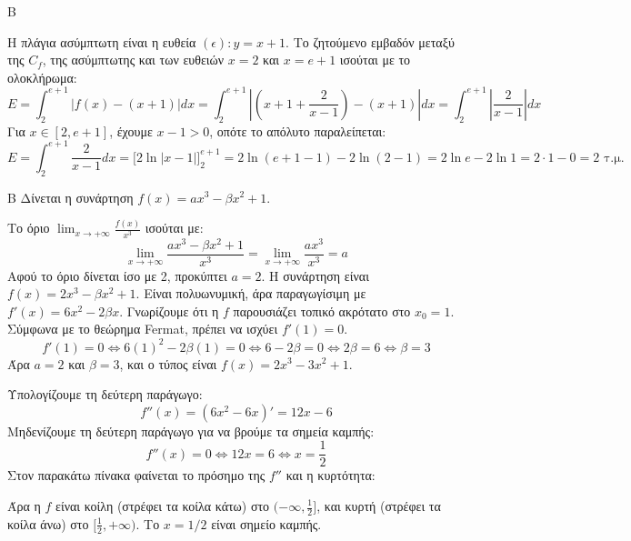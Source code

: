 \begin{thema}{Β}
\begin{erwthma}
\item Η πλάγια ασύμπτωτη είναι η ευθεία $(\epsilon): y = x+1$.
Το ζητούμενο εμβαδόν μεταξύ της $C_f$, της ασύμπτωτης και των ευθειών $x=2$ και $x=e+1$ ισούται με το ολοκλήρωμα:
\[ E = \int_2^{e+1} |f(x) - (x+1)| dx = \int_2^{e+1} \left| \left( x+1+\frac{2}{x-1} \right) - (x+1) \right| dx = \int_2^{e+1} \left| \frac{2}{x-1} \right| dx \]
Για $x \in [2, e+1]$, έχουμε $x-1 > 0$, οπότε το απόλυτο παραλείπεται:
\[ E = \int_2^{e+1} \frac{2}{x-1} dx = \Big[ 2\ln|x-1| \Big]_2^{e+1} = 2\ln(e+1-1) - 2\ln(2-1) = 2\ln e - 2\ln 1 = 2 \cdot 1 - 0 = 2 \text{ τ.μ.} \]
\end{erwthma}
\end{thema}

\begin{thema}{Β}
Δίνεται η συνάρτηση $f(x) = a x^3 - \beta x^2 + 1$.
\begin{erwthma}
\item Το όριο $\lim_{x\to+\infty} \frac{f(x)}{x^3}$ ισούται με:
\[ \lim_{x\to+\infty} \frac{a x^3 - \beta x^2 + 1}{x^3} = \lim_{x\to+\infty} \frac{a x^3}{x^3} = a \]
Αφού το όριο δίνεται ίσο με 2, προκύπτει $a=2$.
Η συνάρτηση είναι $f(x) = 2x^3 - \beta x^2 + 1$. Είναι πολυωνυμική, άρα παραγωγίσιμη με $f'(x) = 6x^2 - 2\beta x$.
Γνωρίζουμε ότι η $f$ παρουσιάζει τοπικό ακρότατο στο $x_0 = 1$. Σύμφωνα με το θεώρημα Fermat, πρέπει να ισχύει $f'(1) = 0$.
\[ f'(1) = 0 \Leftrightarrow 6(1)^2 - 2\beta(1) = 0 \Leftrightarrow 6 - 2\beta = 0 \Leftrightarrow 2\beta = 6 \Leftrightarrow \beta = 3 \]
Άρα $a=2$ και $\beta=3$, και ο τύπος είναι $f(x) = 2x^3 - 3x^2 + 1$.

\item Υπολογίζουμε τη δεύτερη παράγωγο:
\[ f''(x) = (6x^2 - 6x)' = 12x - 6 \]
Μηδενίζουμε τη δεύτερη παράγωγο για να βρούμε τα σημεία καμπής:
\[ f''(x) = 0 \Leftrightarrow 12x = 6 \Leftrightarrow x = \frac{1}{2} \]
Στον παρακάτω πίνακα φαίνεται το πρόσημο της $f''$ και η κυρτότητα:
\begin{center}
\end{center}
Άρα η $f$ είναι κοίλη (στρέφει τα κοίλα κάτω) στο $(-\infty, \frac{1}{2}]$, και κυρτή (στρέφει τα κοίλα άνω) στο $[\frac{1}{2}, +\infty)$. Το $x=1/2$ είναι σημείο καμπής.


\end{erwthma}
\end{thema}
